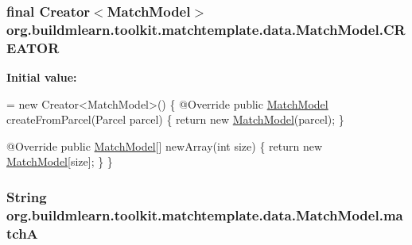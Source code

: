 \subsubsection[{\texorpdfstring{C\+R\+E\+A\+T\+OR}{CREATOR}}]{\setlength{\rightskip}{0pt plus 5cm}final Creator$<${\bf Match\+Model}$>$ org.\+buildmlearn.\+toolkit.\+matchtemplate.\+data.\+Match\+Model.\+C\+R\+E\+A\+T\+OR\hspace{0.3cm}{\ttfamily [static]}}\hypertarget{classorg_1_1buildmlearn_1_1toolkit_1_1matchtemplate_1_1data_1_1MatchModel_a4c528ce7610a239f61a99d7d24d97a7b}{}\label{classorg_1_1buildmlearn_1_1toolkit_1_1matchtemplate_1_1data_1_1MatchModel_a4c528ce7610a239f61a99d7d24d97a7b}
{\bfseries Initial value\+:}
\begin{DoxyCode}
= \textcolor{keyword}{new} Creator<MatchModel>() \{
        @Override
        \textcolor{keyword}{public} \hyperlink{classorg_1_1buildmlearn_1_1toolkit_1_1matchtemplate_1_1data_1_1MatchModel_ae44d04a4b0bbdfedafd20fe01583fe9c}{MatchModel} createFromParcel(Parcel parcel) \{
            \textcolor{keywordflow}{return} \textcolor{keyword}{new} \hyperlink{classorg_1_1buildmlearn_1_1toolkit_1_1matchtemplate_1_1data_1_1MatchModel_ae44d04a4b0bbdfedafd20fe01583fe9c}{MatchModel}(parcel);
        \}

        @Override
        \textcolor{keyword}{public} \hyperlink{classorg_1_1buildmlearn_1_1toolkit_1_1matchtemplate_1_1data_1_1MatchModel_ae44d04a4b0bbdfedafd20fe01583fe9c}{MatchModel}[] newArray(\textcolor{keywordtype}{int} size) \{
            \textcolor{keywordflow}{return} \textcolor{keyword}{new} \hyperlink{classorg_1_1buildmlearn_1_1toolkit_1_1matchtemplate_1_1data_1_1MatchModel_ae44d04a4b0bbdfedafd20fe01583fe9c}{MatchModel}[size];
        \}
    \}
\end{DoxyCode}
\subsubsection[{\texorpdfstring{matchA}{matchA}}]{\setlength{\rightskip}{0pt plus 5cm}String org.\+buildmlearn.\+toolkit.\+matchtemplate.\+data.\+Match\+Model.\+matchA\hspace{0.3cm}{\ttfamily [private]}}\hypertarget{classorg_1_1buildmlearn_1_1toolkit_1_1matchtemplate_1_1data_1_1MatchModel_a479c6e7b7bbab00213072a02ad3a4893}{}\label{classorg_1_1buildmlearn_1_1toolkit_1_1matchtemplate_1_1data_1_1MatchModel_a479c6e7b7bbab00213072a02ad3a4893}
